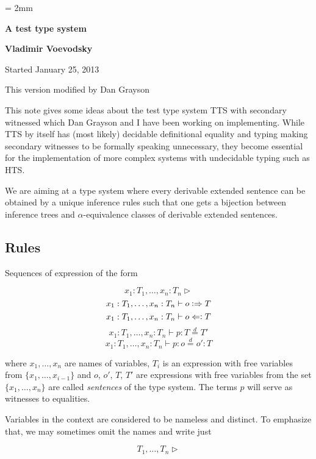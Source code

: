 \documentclass[11pt]{article}
\newcommand{\eqd}{\stackrel{d}{=}}
\newcommand{\synth}{\vcentcolon\Rightarrow}
\newcommand{\force}{\Leftarrow\vcentcolon}
\begin{document}
\parskip = 2mm
\begin{center}
{\bf\Large A test type system}

{\bf Vladimir Voevodsky}

{Started January 25, 2013}  

{This version modified by Dan Grayson}  
\end{center}

\tableofcontents

This note gives some ideas about the test type system TTS with secondary
witnessed which Dan Grayson and I have been working on implementing. While TTS
by itself has (most likely) decidable definitional equality and typing making
secondary witnesses to be formally speaking unnecessary, they become essential
for the implementation of more complex systems with undecidable typing such as
HTS.

We are aiming at a type system where every derivable extended sentence can be
obtained by a unique inference rules such that one gets a bijection between
inference trees and $\alpha$-equivalence classes of derivable extended
sentences.

\subsection{Rules}

Sequences of expression of the form

$$x_1:T_1,\dots,x_n:T_n\rhd$$
$$x_1:T_1,\dots,x_n:T_n\vdash o \synth T$$
$$x_1:T_1,\dots,x_n:T_n\vdash o \force T$$
$$x_1:T_1,\dots,x_n:T_n\vdash p : T \eqd T'$$ 
$$x_1:T_1,\dots,x_n:T_n\vdash p : o \eqd o' : T$$

where $x_1,\dots,x_n$ are names of variables, $T_i$ is an expression with free
variables from $\{x_1,\dots,x_{i-1}\}$ and $o$, $o'$, $T$, $T'$ are expressions
with free variables from the set $\{x_1,\dots,x_n\}$ are called {\em sentences}
of the type system.  The terms $p$ will serve as witnesses to equalities.

Variables in the context are considered to be nameless and distinct.  To
emphasize that, we may sometimes omit the names and write just 

$$T_1,\dots,T_n\rhd$$
\end{document}
